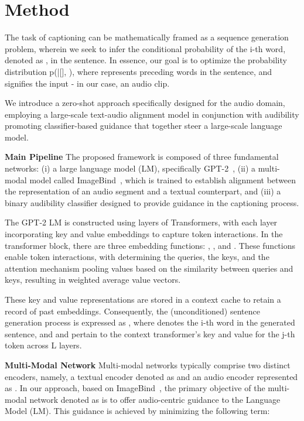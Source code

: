 \documentclass{article}
\begin{document}
\section{Method}





The task of captioning can be mathematically framed as a sequence generation problem, wherein we seek to infer the conditional probability of the i-th word, denoted as , in the sentence. In essence, our goal is to optimize the probability distribution p(|[], ), where  represents preceding words in the sentence, and  signifies the input - in our case, an audio clip.

We introduce a zero-shot approach specifically designed for the audio domain, employing a large-scale text-audio alignment model in conjunction with audibility promoting classifier-based guidance that together steer a large-scale language model.

\noindent\textbf{Main Pipeline\quad}
The proposed framework is composed of three fundamental networks: (i) a large language model (LM), specifically GPT-2~\cite{radford2019language}, (ii) a multi-modal model called ImageBind~\cite{girdhar2023imagebind}, which is trained to establish alignment between the representation of an audio segment and a textual counterpart, and (iii) a binary audibility classifier designed to provide guidance in the captioning process.

The GPT-2 LM is constructed using   layers of Transformers, with each layer incorporating key and value embeddings to capture token interactions. In the transformer block, there are three embedding functions: , , and . These functions enable token interactions, with  determining the queries,  the keys, and the attention mechanism pooling values  based on the similarity between queries and keys, resulting in weighted average value vectors.

These key and value representations are stored in a context cache to retain a record of past embeddings. Consequently, the (unconditioned) sentence generation process is expressed as , where  denotes the i-th word in the generated sentence, and  and  pertain to the context transformer's key and value for the j-th token across L layers. 

\noindent\textbf{Multi-Modal Network\quad}
Multi-modal networks typically comprise two distinct encoders, namely, a textual encoder denoted as  and an audio encoder represented as . In our approach, based on ImageBind~\cite{girdhar2023imagebind}, the primary objective of the multi-modal network denoted as  is to offer audio-centric guidance to the Language Model (LM). This guidance is achieved by minimizing the following term:
\end{document}
